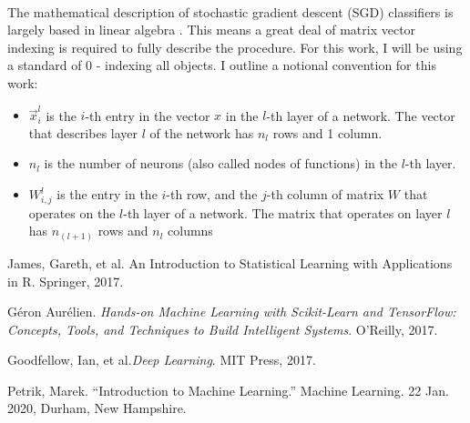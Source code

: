 \documentclass[12pt,letterpaper]{article}
\begin{document}
\paragraph*{}The mathematical description of stochastic gradient descent (SGD) classifiers is largely based in linear algebra \cite{Goodfellow}. This means a great deal of matrix vector indexing is required to fully describe the procedure. For this work, I will be using a standard of $0$ - indexing all objects. I outline a notional convention for this work:
\begin{itemize}
\item $\vec{x}_{i}^{l}$ is the $i$-th entry in the vector $x$ in the $l$-th layer of a network. The vector that describes layer $l$ of the network has $n_l$ rows and 1 column.
\item $n_l$ is the number of neurons (also called nodes of functions) in the 
$l$-th layer. 
\item $W_{i,j}^{l}$ is the entry in the $i$-th row, and the $j$-th column of matrix $W$ that operates on the $l$-th layer of a network. The matrix that operates on layer $l$ has $n_{(l+1)}$ rows and $n_{l}$ columns
\end{itemize}







\begin{thebibliography}{9}


James, Gareth, et al. {An Introduction to Statistical Learning with Applications in R}. Springer, 2017.

Géron Aurélien. \textit{Hands-on Machine Learning with Scikit-Learn and TensorFlow: Concepts, Tools, and Techniques to Build Intelligent Systems}. O'Reilly, 2017.

Goodfellow, Ian, et al.\textit{Deep Learning}. MIT Press, 2017.

Petrik, Marek. “Introduction to Machine Learning.” Machine Learning. 22 Jan. 2020, Durham, New Hampshire.

\end{thebibliography}

\end{document}
